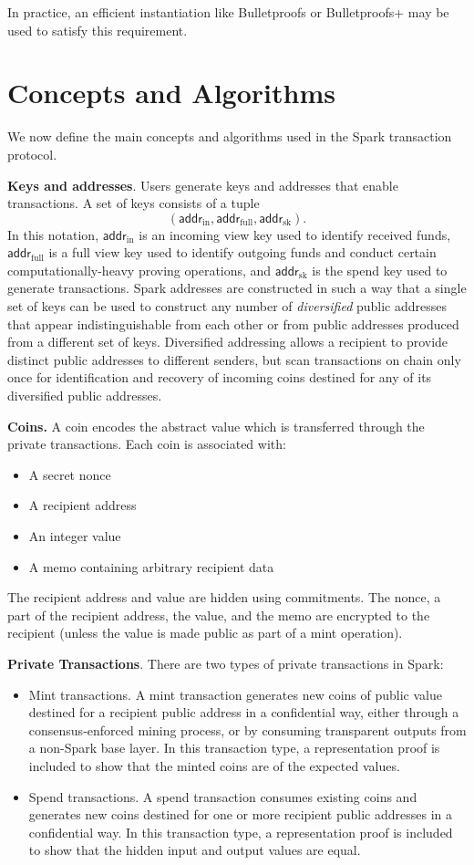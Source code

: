\documentclass{llncs}
\newcommand{\func}[1]{\mathsf{#1}}
\newcommand{\addr}{\func{addr}}
\begin{document}
In practice, an efficient instantiation like Bulletproofs \cite{bp} or Bulletproofs+ \cite{bp_plus} may be used to satisfy this requirement.


\section{Concepts and Algorithms}

We now define the main concepts and algorithms used in the Spark transaction protocol.

\textbf{Keys and addresses}. Users generate keys and addresses that enable transactions.
A set of keys consists of a tuple $$(\addr_{\text{in}}, \addr_{\text{full}}, \addr_{\text{sk}}).$$
In this notation, $\addr_{\text{in}}$ is an incoming view key used to identify received funds, $\addr_{\text{full}}$ is a full view key used to identify outgoing funds and conduct certain computationally-heavy proving operations, and $\addr_{\text{sk}}$ is the spend key used to generate transactions.
Spark addresses are constructed in such a way that a single set of keys can be used to construct any number of \textit{diversified} public addresses that appear indistinguishable from each other or from public addresses produced from a different set of keys.
Diversified addressing allows a recipient to provide distinct public addresses to different senders, but scan transactions on chain only once for identification and recovery of incoming coins destined for any of its diversified public addresses.

\textbf{Coins.} A coin encodes the abstract value which is transferred through the private transactions. Each coin is associated with:
\begin{itemize}
\item A secret nonce
\item A recipient address
\item An integer value
\item A memo containing arbitrary recipient data
\end{itemize}
The recipient address and value are hidden using commitments.
The nonce, a part of the recipient address, the value, and the memo are encrypted to the recipient (unless the value is made public as part of a mint operation).

\textbf{Private Transactions}. There are two types of private transactions in Spark:
\begin{itemize}
    \item Mint transactions.
    A mint transaction generates new coins of public value destined for a recipient public address in a confidential way, either through a consensus-enforced mining process, or by consuming transparent outputs from a non-Spark base layer.
    In this transaction type, a representation proof is included to show that the minted coins are of the expected values.
    \item Spend transactions.
    A spend transaction consumes existing coins and generates new coins destined for one or more recipient public addresses in a confidential way.
    In this transaction type, a representation proof is included to show that the hidden input and output values are equal.
\end{itemize}
\end{document}
